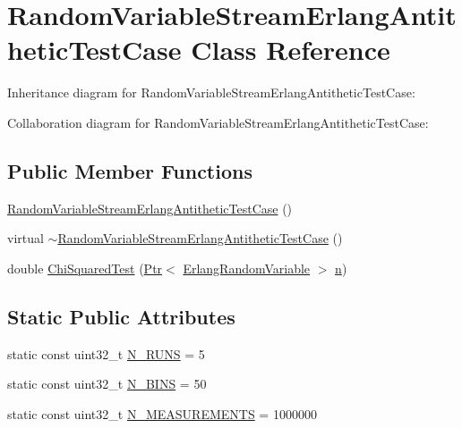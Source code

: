 \hypertarget{classRandomVariableStreamErlangAntitheticTestCase}{}\section{Random\+Variable\+Stream\+Erlang\+Antithetic\+Test\+Case Class Reference}
\label{classRandomVariableStreamErlangAntitheticTestCase}


Inheritance diagram for Random\+Variable\+Stream\+Erlang\+Antithetic\+Test\+Case\+:


Collaboration diagram for Random\+Variable\+Stream\+Erlang\+Antithetic\+Test\+Case\+:
\subsection*{Public Member Functions}
\begin{DoxyCompactItemize}
\item 
\hyperlink{classRandomVariableStreamErlangAntitheticTestCase_ad3911263037524f6f5f38fa6d979fe40}{Random\+Variable\+Stream\+Erlang\+Antithetic\+Test\+Case} ()
\item 
virtual \hyperlink{classRandomVariableStreamErlangAntitheticTestCase_ac65982c53be2b3bdc8f08e79ec92bcee}{$\sim$\+Random\+Variable\+Stream\+Erlang\+Antithetic\+Test\+Case} ()
\item 
double \hyperlink{classRandomVariableStreamErlangAntitheticTestCase_a230873884983c67b51b2a254204f639a}{Chi\+Squared\+Test} (\hyperlink{classns3_1_1Ptr}{Ptr}$<$ \hyperlink{classns3_1_1ErlangRandomVariable}{Erlang\+Random\+Variable} $>$ \hyperlink{lte__link__budget__x2__handover__measures_8m_abdb05bc5a064cf642a06c83b3392f148}{n})
\end{DoxyCompactItemize}
\subsection*{Static Public Attributes}
\begin{DoxyCompactItemize}
\item 
static const uint32\+\_\+t \hyperlink{classRandomVariableStreamErlangAntitheticTestCase_a8100d0fc6db67c589316e1f5fea966bd}{N\+\_\+\+R\+U\+NS} = 5
\item 
static const uint32\+\_\+t \hyperlink{classRandomVariableStreamErlangAntitheticTestCase_aa820bbab5f96c340175484666f90e156}{N\+\_\+\+B\+I\+NS} = 50
\item 
static const uint32\+\_\+t \hyperlink{classRandomVariableStreamErlangAntitheticTestCase_abcfab6f7ba6ed16802e3505c2c023c79}{N\+\_\+\+M\+E\+A\+S\+U\+R\+E\+M\+E\+N\+TS} = 1000000
\end{DoxyCompactItemize}

